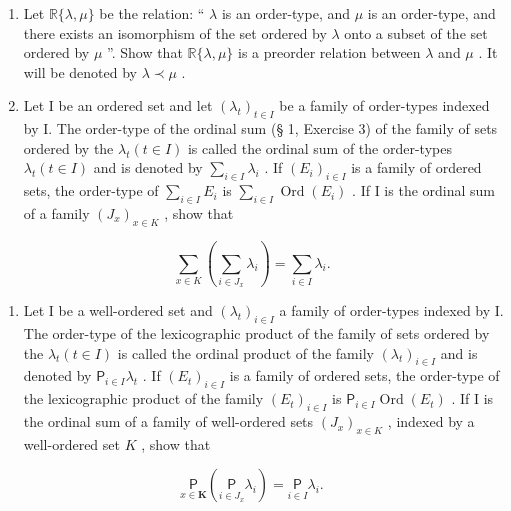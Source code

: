 \begin{enumerate}
\def\labelenumi{(\alph{enumi})}
\setcounter{enumi}{1}
\item
  Let \(\mathbb{R}\{\lambda, \mu\}\) be the relation: `` \(\lambda\) is an order-type, and \(\mu\) is an order-type, and there exists an isomorphism of the set ordered by \(\lambda\) onto a subset of the set ordered by \(\mu\) ''. Show that \(\mathbb{R}\{\lambda, \mu\}\) is a preorder relation between \(\lambda\) and \(\mu\) . It will be denoted by \(\lambda \prec \mu\) .
\item
  Let I be an ordered set and let \((\lambda_{t})_{t\in I}\) be a family of order-types indexed by I. The order-type of the ordinal sum (§ 1, Exercise 3) of the family of sets ordered by the \(\lambda_{t}(t\in I)\) is called the ordinal sum of the order-types \(\lambda_{t}(t\in I)\) and is denoted by \(\sum_{i\in I}\lambda_{i}\) . If \((E_{i})_{i\in I}\) is a family of ordered sets, the order-type of \(\sum_{i\in I}E_{i}\) is \(\sum_{i\in I}\operatorname{Ord}(E_{i})\) . If I is the ordinal sum of a family \((J_{x})_{x\in K}\) , show that
\end{enumerate}

\[
\sum_ {x \in K} \left(\sum_ {i \in J _ {x}} \lambda_ {i}\right) = \sum_ {i \in I} \lambda_ {i}.
\]

\begin{enumerate}
\def\labelenumi{(\alph{enumi})}
\setcounter{enumi}{3}
\tightlist
\item
  Let I be a well-ordered set and \((\lambda_{t})_{i\in I}\) a family of order-types indexed by I. The order-type of the lexicographic product of the family of sets ordered by the \(\lambda_{t} (t\in I)\) is called the ordinal product of the family \((\lambda_{t})_{i\in I}\) and is denoted by \(\mathsf{P}_{i\in I}\lambda_{t}\) . If \((E_{t})_{i\in I}\) is a family of ordered sets, the order-type of the lexicographic product of the family \((E_{t})_{i\in I}\) is \(\mathsf{P}_{i\in I}\operatorname{Ord}(E_{t})\) . If I is the ordinal sum of a family of well-ordered sets \((J_{x})_{x\in K}\) , indexed by a well-ordered set \(K\) , show that
\end{enumerate}

\[
\underset {x \in \mathbf {K}} {\mathsf {P}} \left(\underset {i \in J _ {x}} {\mathsf {P}} \lambda_ {i}\right) = \underset {i \in I} {\mathsf {P}} \lambda_ {i}.
\]

